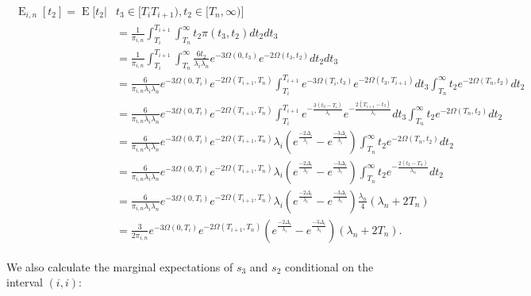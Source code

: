\documentclass{article}
\DeclareMathOperator{\E}{E}
\begin{document}
\begin{align}
    \begin{split}
        \E_{i,n}[t_2] = \E\big[t_2|&t_3 \in [T_i T_{i+1}),t_2 \in [T_n,\infty) \big]\\
        &= \frac{1}{\pi_{i,n}}\int_{T_i}^{T_{i+1}}\int_{T_n}^{\infty}t_2\pi(t_3,t_2)dt_2dt_3\\
        &= \frac{1}{\pi_{i,n}}\int_{T_i}^{T_{i+1}}\int_{T_n}^{\infty}
            \frac{6t_2}{\lambda_i \lambda_n}e^{-3\Omega(0,t_3)}e^{-2\Omega(t_3,t_2)}dt_2dt_3\\
        &= \frac{6}{\pi_{i,n}\lambda_i\lambda_n}e^{-3\Omega(0,T_i)}e^{-2\Omega(T_{i+1},T_n)}
            \int_{T_i}^{T_{i+1}}e^{-3\Omega(T_i,t_3)}e^{-2\Omega(t_3,T_{i+1})}dt_3
            \int_{T_n}^{\infty}t_2e^{-2\Omega(T_n,t_2)}dt_2\\
        &= \frac{6}{\pi_{i,n}\lambda_i\lambda_n}e^{-3\Omega(0,T_i)}e^{-2\Omega(T_{i+1},T_n)}
            \int_{T_i}^{T_{i+1}}e^{-\frac{3(t_3-T_i)}{\lambda_i}}e^{-\frac{2(T_{i+1}-t_3)}{\lambda_i}}dt_3
            \int_{T_n}^{\infty}t_2e^{-2\Omega(T_n,t_2)}dt_2\\
        &= \frac{6}{\pi_{i,n}\lambda_i\lambda_n}e^{-3\Omega(0,T_i)}e^{-2\Omega(T_{i+1},T_n)}
            \lambda_i \left(e^{\frac{-2\Delta_i}{\lambda_i}}-e^{\frac{-3\Delta_i}{\lambda_i}}\right)
            \int_{T_n}^{\infty}t_2e^{-2\Omega(T_n,t_2)}dt_2\\
        &= \frac{6}{\pi_{i,n}\lambda_i\lambda_n}e^{-3\Omega(0,T_i)}e^{-2\Omega(T_{i+1},T_n)}
            \lambda_i \left(e^{\frac{-2\Delta_i}{\lambda_i}}-e^{\frac{-3\Delta_i}{\lambda_i}}\right)
            \int_{T_n}^{\infty}t_2e^{-\frac{2(t_2-T_n)}{\lambda_n}}dt_2\\
        &= \frac{6}{\pi_{i,n}\lambda_i\lambda_n}e^{-3\Omega(0,T_i)}e^{-2\Omega(T_{i+1},T_n)}
            \lambda_i \left(e^{\frac{-2\Delta_i}{\lambda_i}}-e^{\frac{-3\Delta_i}{\lambda_i}}\right)
            \frac{\lambda_n}{4}\left(\lambda_n+2T_n\right)\\
        &= \frac{3}{2\pi_{i,n}}e^{-3\Omega(0,T_i)}e^{-2\Omega(T_{i+1},T_n)}
            \left(e^{\frac{-2\Delta_i}{\lambda_i}}-e^{\frac{-3\Delta_i}{\lambda_i}}\right)
            \left(\lambda_n+2T_n\right).
    \end{split}
    \label{eq:Et2}
\end{align}

We also calculate the marginal expectations of $s_3$ and $s_2$ conditional on
the interval $(i,i)$:
\end{document}
